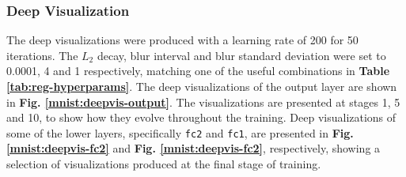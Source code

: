\subsubsection{Deep Visualization}

The deep visualizations were produced with a learning rate of 200 for 50 iterations. The $L_2$ decay, blur interval and blur standard deviation were set to 0.0001, 4 and 1 respectively, matching one of the useful combinations in \textbf{Table \ref{tab:reg-hyperparams}}. The deep visualizations of the output layer are shown in \textbf{Fig. \ref{mnist:deepvis-output}}. The visualizations are presented at stages 1, 5 and 10, to show how they evolve throughout the training. Deep visualizations of some of the lower layers, specifically \texttt{fc2} and \texttt{fc1}, are presented in \textbf{Fig. \ref{mnist:deepvis-fc2}} and \textbf{Fig. \ref{mnist:deepvis-fc2}}, respectively, showing a selection of visualizations produced at the final stage of training.


